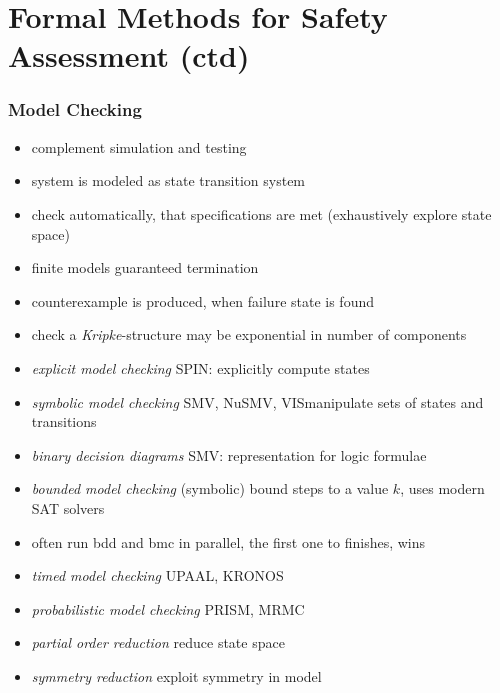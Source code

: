 \documentclass[a4paper, 10pt]{article}
\begin{document}

\section*{Formal Methods for Safety Assessment (ctd)}
\subsubsection*{Model Checking}
\begin{itemize}
    \item complement simulation and testing
    \item system is modeled as state transition system
    \item check automatically, that specifications are met (exhaustively explore state space)
    \item finite models \follows guaranteed termination
    \item counterexample is produced, when failure state is found
    \item check a \emph{Kripke}-structure \follows may be exponential in number of components
    \item \emph{explicit model checking} SPIN: explicitly compute states
    \item \emph{symbolic model checking} SMV, NuSMV, VIS\follows manipulate sets of states and transitions
    \item \emph{binary decision diagrams} SMV: representation for logic formulae
    \item \emph{bounded model checking} (symbolic) bound steps to a value $k$, uses modern SAT solvers
    \item often run bdd and bmc in parallel, the first one to finishes, wins
    \item \emph{timed model checking} UPAAL, KRONOS
    \item \emph{probabilistic model checking} PRISM, MRMC
    \item \emph{partial order reduction} \follows reduce state space
    \item \emph{symmetry reduction} exploit symmetry in model
\end{itemize}
\end{document}
